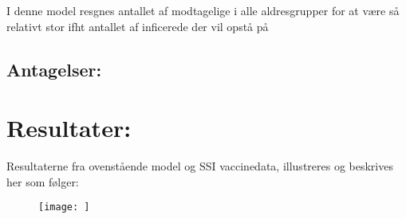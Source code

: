 \documentclass{article}
\begin{document}
I denne model resgnes antallet af modtagelige i alle aldresgrupper for at være så relativt stor ifht antallet af inficerede der vil opstå på 

\subsection*{Antagelser:}

\section*{Resultater:}
Resultaterne fra ovenstående model og SSI vaccinedata, illustreres og beskrives her som følger:
\begin{figure}
\centering
\texttt{[image: ]}
\caption{
\label{fig:}
}
\end{figure}



\printbibliography
\end{document}
